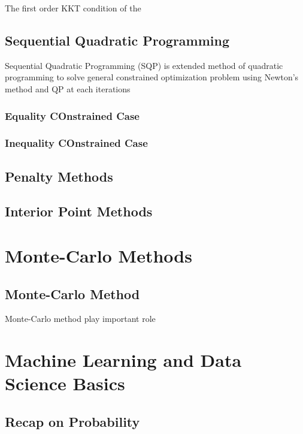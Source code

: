 \documentclass[
  letterpaper,
  DIV=11,
  numbers=noendperiod]{scrreprt}
\theoremstyle{definition}
\theoremstyle{plain}
\theoremstyle{plain}
\theoremstyle{definition}
\theoremstyle{plain}
\theoremstyle{plain}
\theoremstyle{remark}
\begin{document}
The first order KKT condition of the

\chapter{Sequential Quadratic
Programming}\label{sequential-quadratic-programming}

Sequential Quadratic Programming (SQP) is extended method of quadratic
programming to solve general constrained optimization problem using
Newton's method and QP at each iterations

\section{Equality COnstrained Case}\label{equality-constrained-case}

\section{Inequality COnstrained Case}\label{inequality-constrained-case}

\chapter{Penalty Methods}\label{penalty-methods}

\chapter{Interior Point Methods}\label{interior-point-methods}

\part{Monte-Carlo Methods}

\chapter{Monte-Carlo Method}\label{monte-carlo-method}

Monte-Carlo method play important role

\part{Machine Learning and Data Science Basics}

\chapter{Recap on Probability}\label{recap-on-probability}
\end{document}
